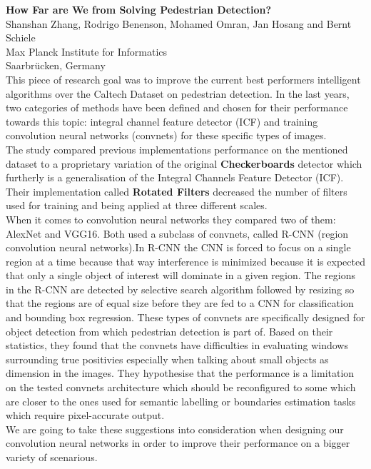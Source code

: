 \documentclass[runningheads,a4paper,11pt]{report}
\begin{document}
\textbf{How Far are We from Solving Pedestrian Detection?} \\
	Shanshan Zhang, Rodrigo Benenson, Mohamed Omran, Jan Hosang and Bernt Schiele \\
	Max Planck Institute for Informatics \\
	Saarbrücken, Germany \\



	This piece of research goal was to improve the current best performers intelligent algorithms over the Caltech Dataset on pedestrian detection. In the last years, two categories of methods have been defined and chosen for their performance towards this topic: integral channel feature detector (ICF) and training convolution neural networks (convnets) for these specific types of images. \\
	The study compared previous implementations performance on the mentioned dataset to a proprietary variation of the original \textbf{Checkerboards} detector which furtherly is a generalisation of the Integral Channels Feature Detector (ICF). Their implementation called \textbf{Rotated Filters} decreased the number of filters used for training and being applied at three different scales. \\
	When it comes to convolution neural networks they compared  two of them: AlexNet and VGG16. Both used a subclass of convnets, called R-CNN (region convolution neural networks).In R-CNN the CNN is forced to focus on a single region at a time because that way interference is minimized because it is expected that only a single object of interest will dominate in a given region. The regions in the R-CNN are detected by selective search algorithm followed by resizing so that the regions are of equal size before they are fed to a CNN for classification and bounding box regression. These types of convnets are specifically designed for object detection from which pedestrian detection is part of. Based on their statistics, they found that the convnets have difficulties in evaluating windows surrounding true positivies especially when talking about small objects as dimension in the images. They hypothesise that the performance is a limitation on the tested convnets architecture which should be reconfigured to some which are closer to the ones used for semantic labelling or boundaries estimation tasks which require pixel-accurate output. \\
	We are going to take these suggestions into consideration when designing our convolution neural networks in order to improve their performance on a bigger variety of scenarious.
\end{document}
